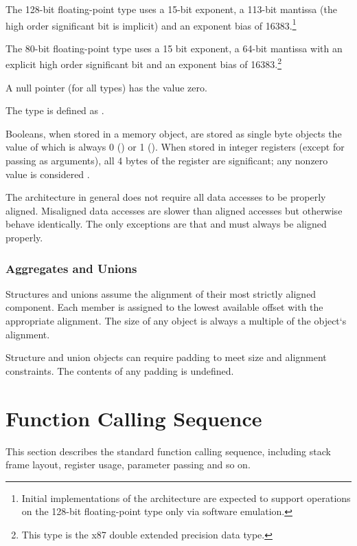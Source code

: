 The 128-bit floating-point type uses a 15-bit exponent, a 113-bit
mantissa (the high order significant bit is implicit) and an exponent
bias of 16383.\footnote{Initial implementations of the \xARCH
  architecture are expected to support operations on the
  128-bit floating-point  type only via software emulation.}

The 80-bit floating-point type uses a 15 bit exponent, a 64-bit mantissa
with an explicit high order significant bit and an exponent bias of
16383.\footnote{This type is the x87 double extended precision data
  type.} 

A null pointer (for all types) has the value zero.

The type  is defined as .

Booleans, when stored in a memory object, are stored as
single byte objects the value of which is always 0 () or 1
().  When stored in integer registers (except for passing
as arguments), all 4 bytes of the register are significant;
any nonzero value is considered .

The \xARCH architecture in general
does not require all data accesses to be properly aligned.  Misaligned
data accesses are slower than aligned accesses
but otherwise behave identically.  The only exceptions are that
 and  must always be aligned properly.

\subsubsection{Aggregates and Unions}

Structures and unions assume the alignment of their most strictly
aligned component.  Each member is assigned to the lowest available
offset with the appropriate alignment.  The size of any object is always
a multiple of the object`s alignment.

Structure and union objects can require padding to meet size and
alignment constraints.  The contents of any padding is undefined.


\section{Function Calling Sequence}

This section describes the standard function calling sequence,
including stack frame layout, register usage, parameter passing and so
on.

